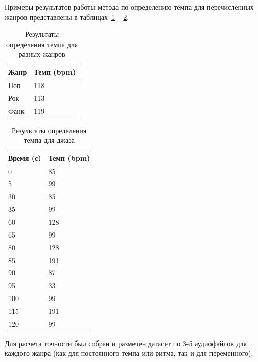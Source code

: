 Примеры результатов работы метода по определению темпа для перечисленных жанров представлены в таблицах~\ref{tab:tempo_genres} -- \ref{tab:tempo_jazz}.

\begin{table}[!h]
	\begin{center}
		\caption{\label{tab:tempo_genres}Результаты определения темпа для разных жанров}
		\begin{tabular}{|p{8cm}|p{8cm}|}
			\hline
			\textbf{Жанр} & \textbf{Темп (bpm)}\\
			\hline
			Поп & 118\\
			\hline
			Рок & 113\\
			\hline
			Фанк & 119\\
			\hline
		\end{tabular}
	\end{center}
\end{table}

\begin{table}[!h]
	\begin{center}
		\caption{\label{tab:tempo_jazz}Результаты определения темпа для джаза}
		\begin{tabular}{|p{8cm}|p{8cm}|}
			\hline
			\textbf{Время (с)} & \textbf{Темп (bpm)}\\
			\hline
			0 & 85\\
			\hline
			5 & 99\\
			\hline
			30 & 85\\
			\hline
			35 & 99\\
			\hline
			60 & 128\\
			\hline
			65 & 99\\
			\hline
			80 & 128\\
			\hline
			85 & 191\\
			\hline
			90 & 87\\
			\hline
			95 & 33\\
			\hline
			100 & 99\\
			\hline
			115 & 191\\
			\hline
			120 & 99\\
			\hline
		\end{tabular}
	\end{center}
\end{table}

\newpage

Для расчета точности был собран и размечен датасет по 3-5 аудиофайлов для каждого жанра (как для постоянного темпа или ритма, так и для переменного).

